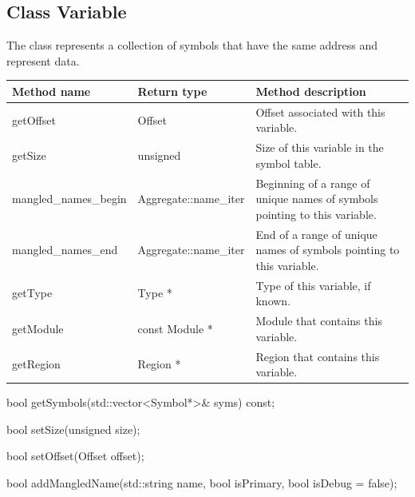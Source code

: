 \subsection{Class Variable}


The  class represents a collection of symbols that have the same address and represent data.

\begin{tabularx}{\textwidth}{llX}
\toprule
Method name & Return type & Method description \\
\midrule
getOffset & Offset & Offset associated with this variable. \\
getSize & unsigned & Size of this variable in the symbol table. \\
mangled\_names\_begin & Aggregate::name\_iter & Beginning of a range of unique names of symbols pointing to this variable. \\
mangled\_names\_end & Aggregate::name\_iter & End of a range of unique names of symbols pointing to this variable. \\
getType & Type * & Type of this variable, if known. \\
getModule & const Module * & Module that contains this variable. \\
getRegion & Region * & Region that contains this variable. \\
\bottomrule
\end{tabularx}

\begin{apient}
bool getSymbols(std::vector<Symbol*>& syms) const;
\end{apient}


\begin{apient}
bool setSize(unsigned size);
\end{apient}

\begin{apient}
bool setOffset(Offset offset);
\end{apient}

\begin{apient}
bool addMangledName(std::string name,
                    bool isPrimary,
                    bool isDebug = false);
\end{apient}

